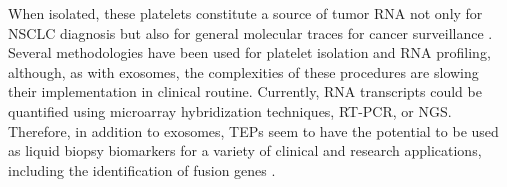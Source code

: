When isolated, these platelets constitute a source of tumor RNA not only for NSCLC diagnosis but also for general molecular traces for cancer surveillance \cite{LB_atocha, Platelets}. Several methodologies have been used for platelet isolation and RNA profiling, although, as with exosomes, the complexities of these procedures are slowing their implementation in clinical routine. Currently, RNA transcripts could be quantified using microarray hybridization techniques, RT-PCR, or NGS. Therefore, in addition to exosomes, TEPs seem to have the potential to be used as liquid biopsy biomarkers for a variety of clinical and research applications, including the identification of fusion genes \cite{LB_atocha}.
